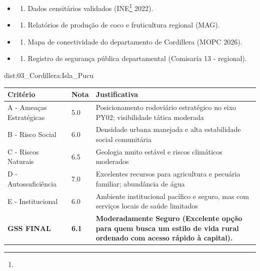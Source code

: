 {\begin{itemize}
\tightlist
\item
  \begin{enumerate}
  \def\labelenumi{\arabic{enumi})}
  \tightlist
  \item
    Dados censitários validados (INE\footnote{\fineINE} 2022).
  \end{enumerate}
\item
  \begin{enumerate}
  \def\labelenumi{\arabic{enumi})}
  \setcounter{enumi}{1}
  \tightlist
  \item
    Relatórios de produção de coco e fruticultura regional (MAG).
  \end{enumerate}
\item
  \begin{enumerate}
  \def\labelenumi{\arabic{enumi})}
  \setcounter{enumi}{2}
  \tightlist
  \item
    Mapa de conectividade do departamento de Cordillera (MOPC 2026).
  \end{enumerate}
\item
  \begin{enumerate}
  \def\labelenumi{\arabic{enumi})}
  \setcounter{enumi}{3}
  \tightlist
  \item
    Registro de segurança pública departamental (Comisaría 13 -
    regional).
  \end{enumerate}
\end{itemize}}{dist:03_Cordillera:Isla_Pucu}
\begin{table}[ht!]
\small \begin{tabular}{p{3.0cm}p{0.8cm}p{6.0cm}} \toprule
\textbf{Critério} & \textbf{Nota} & \textbf{Justificativa} \\ \midrule
A - Ameaças Estratégicas & 5.0 & Posicionamento rodoviário estratégico no eixo PY02; visibilidade tática moderada \\
B - Risco Social & 6.0 & Densidade urbana manejada e alta estabilidade social comunitária \\
C - Riscos Naturais & 6.5 & Geologia muito estável e riscos climáticos moderados \\
D - Autossuficiência & 7.0 & Excelentes recursos para agricultura e pecuária familiar; abundância de água \\
E - Institucional & 6.0 & Ambiente institucional pacífico e seguro, mas com serviços locais de saúde limitados \\
\midrule \textbf{GSS FINAL} & \textbf{6.1} & \textbf{Moderadamente Seguro (Excelente opção para quem busca um estilo de vida rural ordenado com acesso rápido à capital).} \\ \bottomrule \end{tabular}
\end{table}
